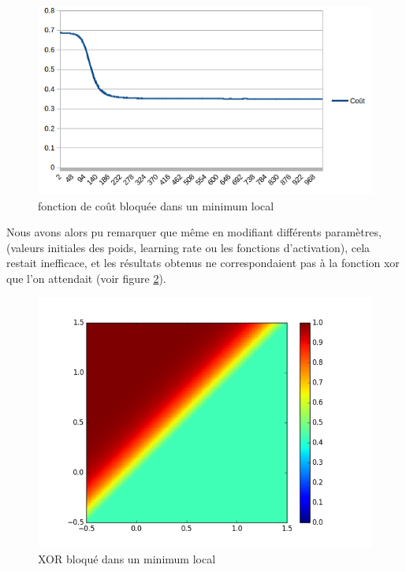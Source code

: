 \documentclass{report}
\theoremstyle{plain}
\theoremstyle{definition}
\theoremstyle{remark}
\begin{document}
\begin{figure}[!h]
\begin{center}
\includegraphics[scale=0.6]{images/xor_cost_function.png}
\caption{fonction de coût bloquée dans un minimum local}
\label{xor_cout_bloque}
\end{center}
\end{figure}

Nous avons alors pu remarquer que même en modifiant différents paramètres, (valeurs initiales des poids, learning rate ou les fonctions d'activation), cela restait inefficace, et les résultats obtenus ne correspondaient pas à la fonction xor que l'on attendait (voir figure \ref{xor_non_fonctionnel}).

\begin{figure}[!h]
\begin{center}
\includegraphics[scale=0.6]{images/xor_non_fonctionnel.png}
\caption{XOR bloqué dans un minimum local}
\label{xor_non_fonctionnel}
\end{center}
\end{figure}
\end{document}
